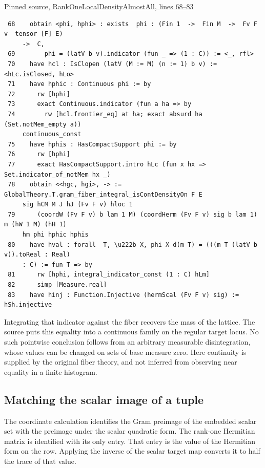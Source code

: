 \documentclass[12pt,letterpaper]{article}
\begin{document}
\par\smallskip\href{https://github.com/nousentllc/riemann-hypothesis/blob/40e56bab026552e089d7afcfeff08d2defb9c005/src/CompanionTheory/SpectralGeometry/LocalGlobalProofs/AdelicAnalysis/RankOneLocalDensityAlmostAll.lean#L68-L83}{\sffamily\small Pinned source, RankOneLocalDensityAlmostAll, lines 68--83}\par

{\footnotesize\begin{verbatim}
 68    obtain <phi, hphi> : exists  phi : (Fin 1  ->  Fin M  ->  Fv F v  tensor [F] E)
     ->  C,
 69        phi = (latV b v).indicator (fun _ => (1 : C)) := <_, rfl>
 70    have hcl : IsClopen (latV (M := M) (n := 1) b v) := <hLc.isClosed, hLo>
 71    have hphic : Continuous phi := by
 72      rw [hphi]
 73      exact Continuous.indicator (fun a ha => by
 74        rw [hcl.frontier_eq] at ha; exact absurd ha (Set.notMem_empty a))
     continuous_const
 75    have hphis : HasCompactSupport phi := by
 76      rw [hphi]
 77      exact HasCompactSupport.intro hLc (fun x hx => Set.indicator_of_notMem hx _)
 78    obtain <<hgc, hgi>, -> := GlobalTheory.T.gram_fiber_integral_isContDensityOn F E
     sig hCM M J hJ (Fv F v) hloc 1
 79      (coordW (Fv F v) b lam 1 M) (coordHerm (Fv F v) sig b lam 1) m (hW 1 M) (hH 1)
     hm phi hphic hphis
 80    have hval : forall  T, \u222b X, phi X d(m T) = (((m T (latV b v)).toReal : Real)
     : C) := fun T => by
 81      rw [hphi, integral_indicator_const (1 : C) hLm]
 82      simp [Measure.real]
 83    have hinj : Function.Injective (hermScal (Fv F v) sig) := hSh.injective
\end{verbatim}
}

Integrating that indicator against the fiber recovers the mass of the lattice. The source puts this equality into a continuous family on the regular target locus. No such pointwise conclusion follows from an arbitrary measurable disintegration, whose values can be changed on sets of base measure zero. Here continuity is supplied by the original fiber theory, and not inferred from observing near equality in a finite histogram.

\clearpage\subsection*{Matching the scalar image of a tuple}

The coordinate calculation identifies the Gram preimage of the embedded scalar set with the preimage under the scalar quadratic form. The rank-one Hermitian matrix is identified with its only entry. That entry is the value of the Hermitian form on the row. Applying the inverse of the scalar target map converts it to half the trace of that value.
\end{document}
